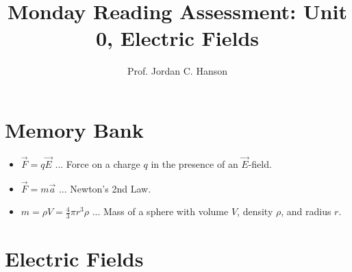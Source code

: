 \documentclass{article}
\begin{document}
\title{Monday Reading Assessment: Unit 0, Electric Fields}
\author{Prof. Jordan C. Hanson}

\maketitle

\section{Memory Bank}

\begin{itemize}
\item $\vec{F} = q \vec{E}$ ... Force on a charge $q$ in the presence of an $\vec{E}$-field.
\item $\vec{F} = m\vec{a}$ ... Newton's 2nd Law.
\item $m = \rho V = \frac{4}{3}\pi r^3 \rho$ ... Mass of a sphere with volume $V$, density $\rho$, and radius $r$.
\end{itemize}

\section{Electric Fields}
\end{document}
